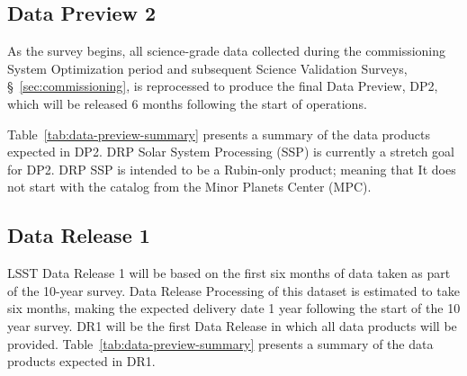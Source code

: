 \subsection{Data Preview 2}
\label{sec:dp2}

As the survey begins, all science-grade data collected during the commissioning System Optimization period and subsequent Science Validation Surveys, \S~\ref{sec:commissioning}, is reprocessed to produce the final Data Preview, DP2, which will be released 6 months following the start of operations.

Table~\ref{tab:data-preview-summary} presents a summary of the data products expected in DP2.
DRP Solar System Processing (SSP)  is currently a stretch goal for DP2. 
DRP SSP is intended to be a Rubin-only product; meaning that  It does not start with the catalog from the Minor Planets Center (MPC).


\subsection{Data Release 1}
\label{sec:dr1}

LSST Data Release 1 will be based on the first six months of data taken as part of the 10-year survey. 
Data Release Processing of this dataset is estimated to take six months, making the expected delivery date 1 year following the start of the 10 year survey. 
DR1 will be the first Data Release in which all data products will be provided.
Table~\ref{tab:data-preview-summary} presents a summary of the data products expected in DR1.



